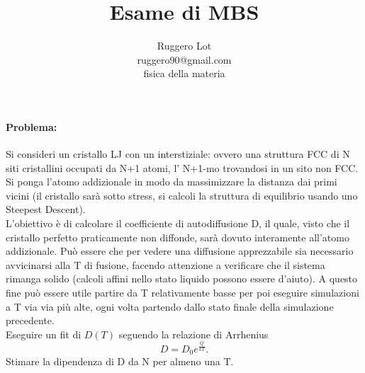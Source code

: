 \documentclass[a4paper,11pt]{article}
\author{Ruggero Lot \\ ruggero90@gmail.com \\ fisica della materia \\}
\title{Esame di MBS}
\begin{document}
	\maketitle
	\paragraph{Problema:} %
	\label{par:problema}
		Si consideri un cristallo LJ con un interstiziale: ovvero una struttura
		FCC di N siti cristallini occupati da N+1 atomi, l' N+1-mo trovandosi in
		un sito non FCC. Si ponga l'atomo addizionale in modo da massimizzare la
		distanza dai primi vicini (il cristallo sarà sotto stress, si calcoli la
		struttura di equilibrio usando uno Steepest Descent).\\
		L'obiettivo è di calcolare il coefficiente di autodiffusione D, il quale,
		visto che il cristallo perfetto praticamente non diffonde, sarà dovuto 
		interamente all'atomo addizionale. Può essere che per vedere una diffusione
		apprezzabile sia necessario avvicinarsi alla T di fusione, facendo
		attenzione a verificare che il sistema rimanga solido (calcoli affini
		nello stato liquido possono essere d'aiuto). A questo fine può essere
		utile partire da T relativamente basse per poi eseguire simulazioni a T
		via via più alte, ogni volta partendo dallo stato finale della simulazione
		precedente.\\
		Eseguire un fit di $D(T)$ seguendo la relazione di Arrhenius
		\begin{equation*}
			D = D_0 e^{\frac{Q}{kT}}. 
		\end{equation*}
		Stimare la dipendenza di D da N per almeno una T.
	\newpage
	\tableofcontents
	\newpage
\end{document}
